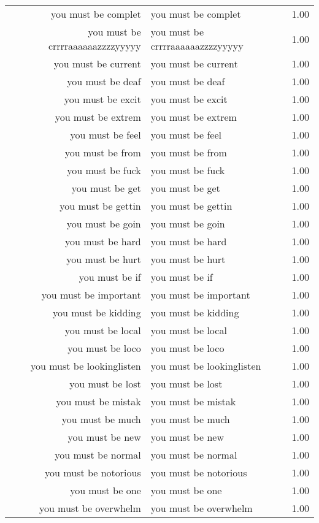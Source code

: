 \begin{table}[ht]
\begin{tabular}{rlr}
  you must be complet & you must be complet & 1.00 \\ 
  you must be crrrraaaaaazzzzyyyyy & you must be crrrraaaaaazzzzyyyyy & 1.00 \\ 
  you must be current & you must be current & 1.00 \\ 
  you must be deaf & you must be deaf & 1.00 \\ 
  you must be excit & you must be excit & 1.00 \\ 
  you must be extrem & you must be extrem & 1.00 \\ 
  you must be feel & you must be feel & 1.00 \\ 
  you must be from & you must be from & 1.00 \\ 
  you must be fuck & you must be fuck & 1.00 \\ 
  you must be get & you must be get & 1.00 \\ 
  you must be gettin & you must be gettin & 1.00 \\ 
  you must be goin & you must be goin & 1.00 \\ 
  you must be hard & you must be hard & 1.00 \\ 
  you must be hurt & you must be hurt & 1.00 \\ 
  you must be if & you must be if & 1.00 \\ 
  you must be important & you must be important & 1.00 \\ 
  you must be kidding & you must be kidding & 1.00 \\ 
  you must be local & you must be local & 1.00 \\ 
  you must be loco & you must be loco & 1.00 \\ 
  you must be lookinglisten & you must be lookinglisten & 1.00 \\ 
  you must be lost & you must be lost & 1.00 \\ 
  you must be mistak & you must be mistak & 1.00 \\ 
  you must be much & you must be much & 1.00 \\ 
  you must be new & you must be new & 1.00 \\ 
  you must be normal & you must be normal & 1.00 \\ 
  you must be notorious & you must be notorious & 1.00 \\ 
  you must be one & you must be one & 1.00 \\ 
  you must be overwhelm & you must be overwhelm & 1.00 \\ 

\end{tabular}
\end{table}

